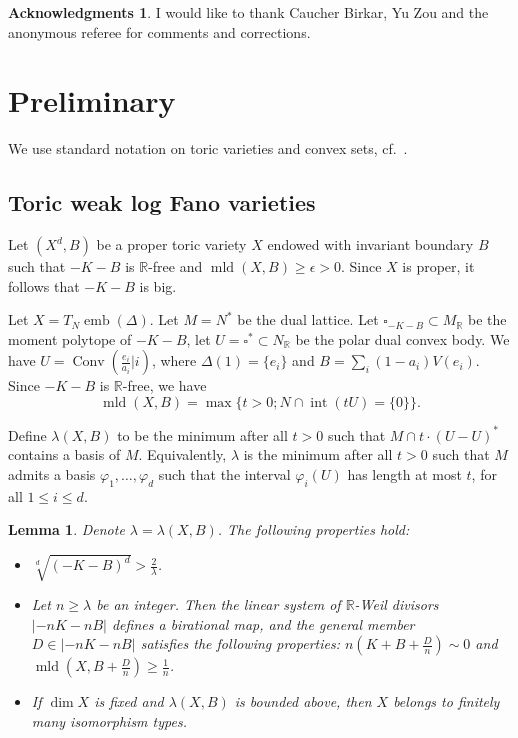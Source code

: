 \documentclass[12pt,twoside]{amsart}
\newcommand{\R}{{\mathbb R}}
\newcommand{\Conv}{\operatorname{Conv}}
\newcommand{\emb}{\operatorname{emb}}
\newcommand{\Int}{\operatorname{int}}
\newcommand{\mld}{\operatorname{mld}}
\theoremstyle{plain}
\newtheorem{lem}[thm]{Lemma}
\theoremstyle{definition}
\newtheorem{ack}{Acknowledgments}  \renewcommand{\theack}{}
\theoremstyle{remark}
\begin{document}
\begin{ack} 
I would like to thank Caucher Birkar, Yu Zou and the anonymous referee for comments and corrections.
\end{ack}


\section{Preliminary}


We use standard notation on toric varieties and convex sets, cf.~\cite{Oda88}.


\subsection{Toric weak log Fano varieties}


Let $(X^d,B)$ be a proper toric variety $X$ endowed with invariant boundary $B$ 
such that $-K-B$ is $\R$-free and $\mld(X,B)\ge \epsilon>0$. Since $X$ is proper,
it follows that $-K-B$ is big. 

Let $X=T_N\emb(\Delta)$. Let 
$M=N^*$ be the dual lattice. Let $\square_{-K-B}\subset M_\R$ be the moment
polytope of $-K-B$, let $U=\square^*\subset N_\R$ be the polar dual convex body.
We have $U=\Conv(\frac{e_i}{a_i}|i)$, where $\Delta(1)=\{e_i\}$ and 
$B=\sum_i(1-a_i)V(e_i)$. Since $-K-B$ is $\R$-free, we have
$$
\mld(X,B)=\max\{t>0; N\cap \Int(tU)=\{0\} \}.
$$

Define $\lambda(X,B)$ to be the minimum after all $t>0$ such that 
$M\cap t\cdot (U-U)^*$ contains a basis of $M$. Equivalently,
$\lambda$ is the minimum after all $t>0$ such that $M$ admits a basis
$\varphi_1,\ldots,\varphi_d$ such that the interval $\varphi_i(U)$
has length at most $t$, for all $1\le i\le d$.

\begin{lem}\label{lp} Denote $\lambda=\lambda(X,B)$. The following properties hold:
	\begin{itemize}
		\item[a)] $\sqrt[d]{(-K-B)^d} > \frac{2}{\lambda}$.
		\item[b)] Let $n\ge \lambda$ be an integer. Then the linear system of $\R$-Weil divisors
		$|-nK-nB|$ defines a birational map, and the general member $D\in |-nK-nB|$ satisfies
		the following properties: $n(K+B+\frac{D}{n})\sim 0$ and $\mld(X,B+\frac{D}{n})\ge \frac{1}{n}$.
		\item[c)] If $\dim X$ is fixed and $\lambda(X,B)$ is bounded above, then $X$ belongs to
		finitely many isomorphism types.
	\end{itemize}
\end{lem}
\end{document}
